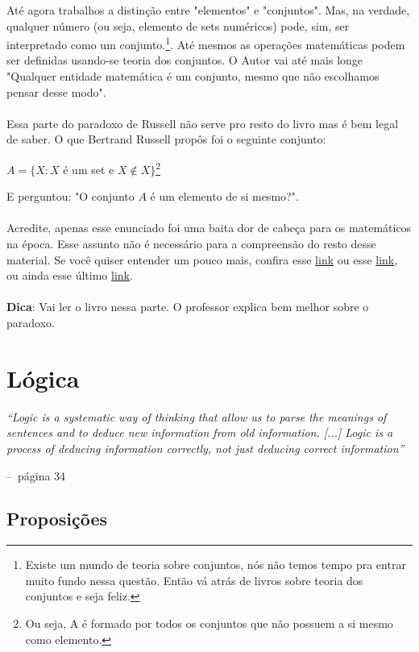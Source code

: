 \documentclass[a4paper,11pt,oneside]{book}
\makeatletter
\theoremstyle{definition}
\theoremstyle{break}
\newenvironment{chapquote}[2][2em]
  {\setlength{\@tempdima}{#1}%
   \def\chapquote@author{#2}%
   \parshape 1 \@tempdima \dimexpr\textwidth-2\@tempdima\relax%
   \itshape}
  {\par\normalfont\hfill--\ \chapquote@author\hspace*{\@tempdima}\par\bigskip}
\makeatother
\begin{document}
Até agora trabalhos a distinção entre "elementos" e "conjuntos". Mas, na verdade, qualquer número (ou seja, elemento de sets numéricos) pode, sim, ser interpretado como um conjunto.\footnote{Existe um mundo de teoria sobre conjuntos, nós não temos tempo pra entrar muito fundo nessa questão. Então vá atrás de livros sobre teoria dos conjuntos e seja feliz.}. Até mesmos as operações matemáticas podem ser definidas usando-se teoria dos conjuntos. O Autor vai até mais longe "Qualquer entidade matemática é um conjunto, mesmo que não escolhamos pensar desse modo".
\\
\\
Essa parte do paradoxo de Russell não serve pro resto do livro mas é bem legal de saber. O que Bertrand Russell propôs foi o seguinte conjunto:
\begin{center}
	$ A = \{ X : X $ é um set e $X \notin X \}$\footnote{Ou seja, A é formado por todos os conjuntos que não possuem a si mesmo como elemento.}
\end{center}
E perguntou: "O conjunto $A$ é um elemento de si mesmo?".
\\
\\
Acredite, apenas esse enunciado foi uma baita dor de cabeça para os matemáticos na época. Esse assunto não é necessário para a compreensão do resto desse material. Se você quiser entender um pouco mais, confira esse \href{https://www.youtube.com/watch?v=AQTTYAM8BF0}{link} ou esse \href{https://www.youtube.com/watch?v=0Bs0lJRxOaI}{link}, ou ainda esse último \href{https://www.youtube.com/watch?v=HeQX2HjkcNo}{link}.
\\
\\
\textbf{Dica}: Vai ler o livro nessa parte. O professor explica bem melhor sobre o paradoxo.

\chapter{Lógica}

\begin{chapquote}{página 34}
	``Logic is a systematic way of thinking that allow us to parse the meanings of sentences and to deduce new information from old information. [...] Logic is  a process of deducing information correctly, not just deducing correct information''
\end{chapquote}

\section{Proposições}
\end{document}
